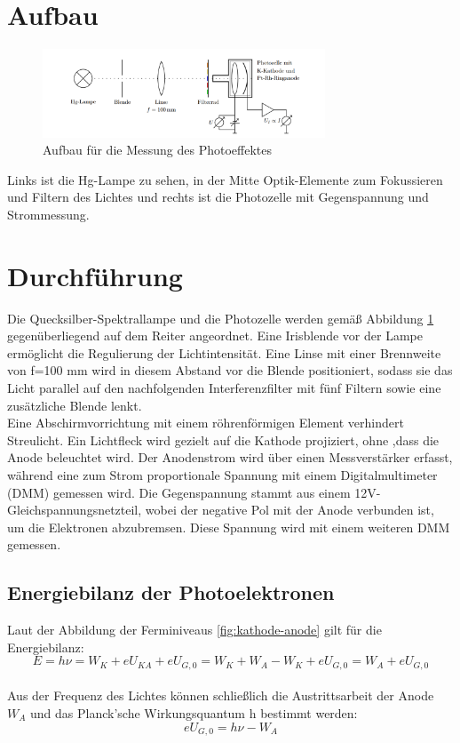 \section{Aufbau}
\begin{figure}[htbp]
    \centering
    \includegraphics[width=0.75\textwidth]{figs/Aufbau_plank_wirkungsquantum.png}
    \caption{Aufbau für die Messung des Photoeffektes  \cite{praktikum}}
    \label{fig:aufbau teil 1}
\end{figure}
\FloatBarrier
Links ist die Hg-Lampe zu sehen, in der
Mitte Optik-Elemente zum Fokussieren und Filtern des Lichtes und rechts ist die Photozelle
mit Gegenspannung und Strommessung.

\section{Durchführung}
Die Quecksilber-Spektrallampe und die Photozelle werden gemäß Abbildung \ref{fig:aufbau teil 1} gegenüberliegend auf dem Reiter angeordnet. Eine Irisblende vor der Lampe ermöglicht die Regulierung der Lichtintensität. Eine Linse mit einer Brennweite von f=100 mm wird in diesem Abstand vor die Blende positioniert, sodass sie das Licht parallel auf den nachfolgenden Interferenzfilter mit fünf Filtern sowie eine zusätzliche Blende lenkt.\\
Eine Abschirmvorrichtung mit einem röhrenförmigen Element verhindert Streulicht. Ein Lichtfleck wird gezielt auf die Kathode projiziert, ohne ,dass die Anode beleuchtet wird. Der Anodenstrom wird über einen Messverstärker erfasst, während eine zum Strom proportionale Spannung mit einem Digitalmultimeter (DMM) gemessen wird. Die Gegenspannung stammt aus einem 12V-Gleichspannungsnetzteil, wobei der negative Pol mit der Anode verbunden ist, um die Elektronen abzubremsen. Diese Spannung wird mit einem weiteren DMM gemessen.
\subsection{Energiebilanz der Photoelektronen}
Laut der Abbildung der Ferminiveaus \ref{fig:kathode-anode} gilt für die Energiebilanz:
\begin{equation}
    E = h\nu = W_K + eU_{KA} + eU_{G,0} 
    = W_K + W_A - W_K + eU_{G,0} 
    = W_A + eU_{G,0}
\end{equation}\\
Aus der Frequenz des Lichtes können schließlich
die Austrittsarbeit der Anode $W_A$ und das Planck’sche Wirkungsquantum h bestimmt werden:
\begin{equation}
    eU_{G,0} = h\nu - W_A
\end{equation}
